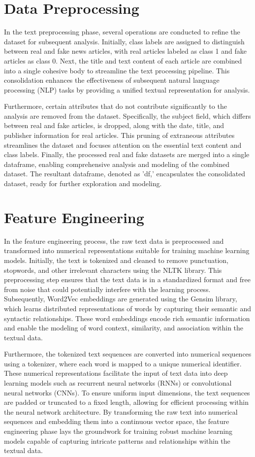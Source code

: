  
\section{{Data Preprocessing}}
 In the text preprocessing phase, several operations are conducted to refine the dataset for subsequent analysis. Initially, class labels are assigned to distinguish between real and fake news articles, with real articles labeled as class 1 and fake articles as class 0. Next, the title and text content of each article are combined into a single cohesive body to streamline the text processing pipeline. This consolidation enhances the effectiveness of subsequent natural language processing (NLP) tasks by providing a unified textual representation for analysis.

Furthermore, certain attributes that do not contribute significantly to the analysis are removed from the dataset. Specifically, the subject field, which differs between real and fake articles, is dropped, along with the date, title, and publisher information for real articles. This pruning of extraneous attributes streamlines the dataset and focuses attention on the essential text content and class labels. Finally, the processed real and fake datasets are merged into a single dataframe, enabling comprehensive analysis and modeling of the combined dataset. The resultant dataframe, denoted as 'df,' encapsulates the consolidated dataset, ready for further exploration and modeling.

\section{{Feature Engineering}}
In the feature engineering process, the raw text data is preprocessed and transformed into numerical representations suitable for training machine learning models. Initially, the text is tokenized and cleaned to remove punctuation, stopwords, and other irrelevant characters using the NLTK library. This preprocessing step ensures that the text data is in a standardized format and free from noise that could potentially interfere with the learning process. Subsequently, Word2Vec embeddings are generated using the Gensim library, which learns distributed representations of words by capturing their semantic and syntactic relationships. These word embeddings encode rich semantic information and enable the modeling of word context, similarity, and association within the textual data.

Furthermore, the tokenized text sequences are converted into numerical sequences using a tokenizer, where each word is mapped to a unique numerical identifier. These numerical representations facilitate the input of text data into deep learning models such as recurrent neural networks (RNNs) or convolutional neural networks (CNNs). To ensure uniform input dimensions, the text sequences are padded or truncated to a fixed length, allowing for efficient processing within the neural network architecture. By transforming the raw text into numerical sequences and embedding them into a continuous vector space, the feature engineering phase lays the groundwork for training robust machine learning models capable of capturing intricate patterns and relationships within the textual data.

